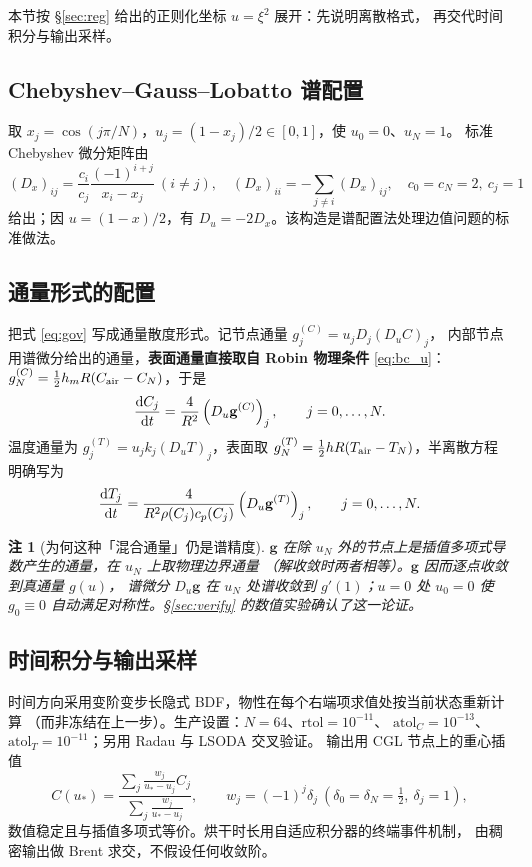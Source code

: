 \documentclass[withoutpreface,bwprint]{cumcmthesis}
\newtheorem{remark}{注}
\begin{document}
本节按 \S\ref{sec:reg} 给出的正则化坐标 $u=\xi^2$ 展开：先说明离散格式，
再交代时间积分与输出采样。

\subsection{Chebyshev--Gauss--Lobatto 谱配置}

取 $x_j=\cos(j\pi/N)$，$u_j=(1-x_j)/2\in[0,1]$，使 $u_0=0$、$u_N=1$。
标准 Chebyshev 微分矩阵由
\[
(D_x)_{ij}=\frac{c_i}{c_j}\frac{(-1)^{i+j}}{x_i-x_j}\ (i\ne j),\quad
(D_x)_{ii}=-\sum_{j\ne i}(D_x)_{ij},\quad
c_0=c_N=2,\ c_j=1
\]
给出；因 $u=(1-x)/2$，有 $D_u=-2D_x$。该构造是谱配置法处理边值问题的标准做法\cite{trefethen}。

\subsection{通量形式的配置}

把式 \eqref{eq:gov} 写成通量散度形式。记节点通量 $g_j^{(C)}=u_jD_j(D_uC)_j$，
内部节点用谱微分给出的通量，\textbf{表面通量直接取自 Robin 物理条件} \eqref{eq:bc_u}：
$g_N^{(C)}=\frac12h_mR(C_{\rm air}-C_N)$，于是
\begin{equation}
\frac{{\rm d}C_j}{{\rm d}t}=\frac{4}{R^2}\left(D_u\mathbf{g}^{(C)}\right)_j,
\qquad j=0,\dots,N.
\end{equation}
温度通量为 $g_j^{(T)}=u_jk_j(D_uT)_j$，表面取
$g_N^{(T)}=\frac12hR(T_{\rm air}-T_N)$，半离散方程明确写为
\begin{equation}
\frac{{\rm d}T_j}{{\rm d}t}
=\frac{4}{R^2\rho(C_j)c_p(C_j)}
\left(D_u\mathbf{g}^{(T)}\right)_j,
\qquad j=0,\dots,N.
\end{equation}

\begin{remark}[为何这种「混合通量」仍是谱精度]
$\mathbf g$ 在除 $u_N$ 外的节点上是插值多项式导数产生的通量，在 $u_N$ 上取物理边界通量
（解收敛时两者相等）。$\mathbf g$ 因而逐点收敛到真通量 $g(u)$，
谱微分 $D_u\mathbf g$ 在 $u_N$ 处谱收敛到 $g'(1)$；$u=0$ 处 $u_0=0$ 使 $g_0\equiv0$
自动满足对称性。\S\ref{sec:verify} 的数值实验确认了这一论证。
\end{remark}

\subsection{时间积分与输出采样}

时间方向采用变阶变步长隐式 BDF，物性在每个右端项求值处按当前状态重新计算
（而非冻结在上一步）。生产设置：$N=64$、$\mathrm{rtol}=10^{-11}$、
$\mathrm{atol}_C=10^{-13}$、$\mathrm{atol}_T=10^{-11}$；另用 Radau 与 LSODA 交叉验证。
输出用 CGL 节点上的重心插值
\[
C(u_*)=\frac{\sum_j\frac{w_j}{u_*-u_j}C_j}{\sum_j\frac{w_j}{u_*-u_j}},
\qquad w_j=(-1)^j\delta_j\ (\delta_0=\delta_N=\tfrac12,\ \delta_j=1),
\]
数值稳定且与插值多项式等价\cite{berrut}。烘干时长用自适应积分器的终端事件机制，
由稠密输出做 Brent 求交，不假设任何收敛阶。
\end{document}
